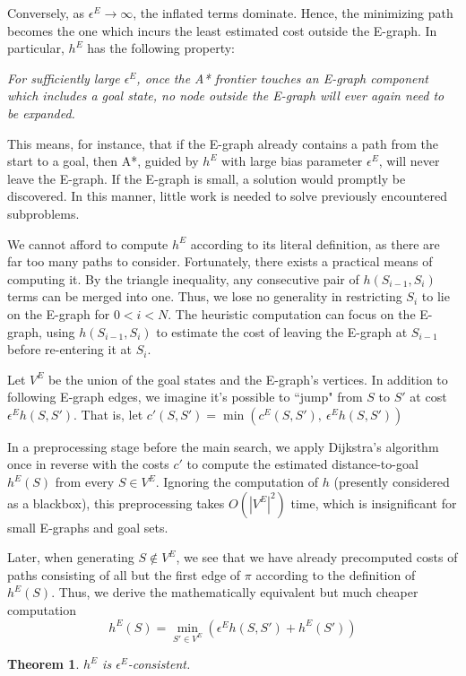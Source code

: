 \documentclass[letterpaper]{article}
\newtheorem{thm}{Theorem}
\begin{document}
Conversely, as $\epsilon^E \rightarrow\infty$, the inflated terms dominate. Hence, the minimizing path becomes the one which incurs the least estimated cost outside the E-graph. In particular, $h^E$ has the following property:

\textit{For sufficiently large $\epsilon^E$, once the A* frontier touches an E-graph component which includes a goal state, no node outside the E-graph will ever again need to be expanded.}

This means, for instance, that if the E-graph already contains a path from the start to a goal, then A*, guided by $h^E$ with large bias parameter $\epsilon^E$, will never leave the E-graph.
If the E-graph is small, a solution would promptly be discovered.
In this manner, little work is needed to solve previously encountered subproblems.

We cannot afford to compute $h^E$ according to its literal definition, as there are far too many paths to consider.
Fortunately, there exists a practical means of computing it. By the triangle inequality, any consecutive pair of $h(S_{i-1},S_i)$ terms can be merged into one.
Thus, we lose no generality in restricting $S_i$ to lie on the E-graph for $0 < i < N$.
The heuristic computation can focus on the E-graph, using $h(S_{i-1},S_i)$ to estimate the cost of leaving the E-graph at $S_{i-1}$ before re-entering it at $S_i$.

Let $V^E$ be the union of the goal states and the E-graph's vertices.
In addition to following E-graph edges, we imagine it's possible to ``jump" from $S$ to $S'$ at cost $\epsilon^E h(S,S')$.
That is, let $c'(S,S') = \min\left(c^E(S,S'),~\epsilon^E h(S,S')\right)$


In a preprocessing stage before the main search, we apply Dijkstra's algorithm once in reverse with the costs $c'$ to compute the estimated distance-to-goal $h^E(S)$ from every $S\in V^E$. Ignoring the computation of $h$ (presently considered as a blackbox), this preprocessing takes $O(|V^E|^2)$ time, which is insignificant for small E-graphs and goal sets.

Later, when generating $S \notin V^E$, we see that we have already precomputed costs of paths consisting of all but the first edge of $\pi$ according to the definition of $h^E(S)$. Thus, we derive the mathematically equivalent but much cheaper computation
\[h^E(S) = \min_{S'\in V^E} \left(\epsilon^E h(S,S') + h^E(S')\right)\]

\begin{thm}$h^E$ is $\epsilon^E$-consistent. \cite{phillips2012graphs}\end{thm}
\end{document}
